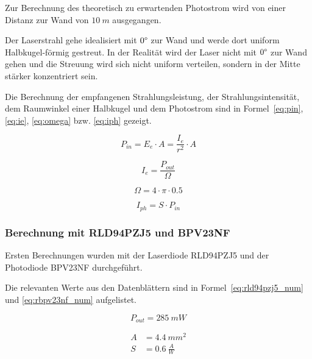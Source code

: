 Zur Berechnung des theoretisch zu erwartenden Photostrom wird von einer Distanz zur Wand von $10~m$ ausgegangen.

Der Laserstrahl gehe idealisiert mit $0\degree$ zur Wand und werde dort uniform Halbkugel-förmig gestreut. In der
Realität wird der Laser nicht mit $0\degree$ zur Wand gehen und die Streuung wird sich nicht uniform verteilen, sondern
in der Mitte stärker konzentriert sein.

Die Berechnung der empfangenen Strahlungsleistung, der Strahlungsintensität, dem Raumwinkel einer Halbkugel und dem
Photostrom sind in Formel~\ref{eq:pin}, \ref{eq:ie}, \ref{eq:omega} bzw. \ref{eq:iph} gezeigt.

\begin{equation}\label{eq:pin}
    P_{in} = E_e \cdot A = \frac{I_e}{r^2} \cdot A
\end{equation}

\begin{equation}\label{eq:ie}
    I_e = \frac{P_{out}}{\Omega}
\end{equation}

\begin{equation}\label{eq:omega}
    \Omega = 4\cdot \pi \cdot 0.5
\end{equation}

\begin{equation}\label{eq:iph}
    I_{ph} = S \cdot P_{in}
\end{equation}

\subsubsection{Berechnung mit RLD94PZJ5 und BPV23NF}

Ersten Berechnungen wurden mit der Laserdiode RLD94PZJ5 \cite{rohm2020rld94pzj5_datasheet} und der Photodiode BPV23NF
\cite{vishay2024bpv23nf_datasheet} durchgeführt.

Die relevanten Werte aus den Datenblättern sind in Formel~\ref{eq:rld94pzj5_num} und \ref{eq:rbpv23nf_num} aufgelistet.

\begin{equation}\label{eq:rld94pzj5_num}
    P_{out} = 285~mW
\end{equation}

\begin{equation}\label{eq:rbpv23nf_num}
    \begin{split}
        A &= 4.4~mm^2\\
        S &= 0.6~\frac{A}{W}
    \end{split}
\end{equation}

